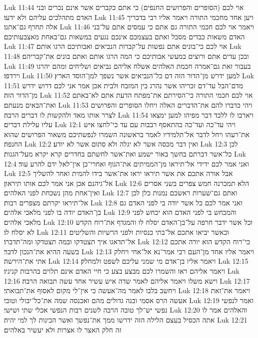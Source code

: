 Luk 11:44  אוי לכם (הסופרים והפרושים החנפים) כי אתם כקברים אשר אינם נכרים ובני האדם מתהלכים עליהם ולא ידעו׃
Luk 11:45  ויען אחד מחכמי התורה ויאמר אליו רבי בדבריך אלה תחרף גם־אתנו׃
Luk 11:46  ויאמר אוי לכם חכמי התורה גם אתם כי עמסים אתם על־בני האדם משאות כבדים מסבל ואתם בעצמכם אינכם נגעים במשאות גם־באחת מאצבעותיכם׃
Luk 11:47  אוי לכם כי־בונים אתם נפשות על־קברות הנביאים ואבותיכם הרגו אותם׃
Luk 11:48  ובכן עדים אתם ורוצים במעשי אבותיכם כי המה הרגו אותם ואתם בונים את־קבריהם׃
Luk 11:49  בעבור זאת גם־אמרה חכמת האלהים אשלח אליהם נביאים ושליחים ומהם יהרגו וירדפו׃
Luk 11:50  למען ידרש מן־הדור הזה דם כל־הנביאים אשר נשפך למן־הוסד הארץ׃
Luk 11:51  מדם־הבל עד־דם זכריהו אשר נהרג בין המזבח ולבית אכן אמר אני לכם דרוש ידרש מן־הדור הזה׃
Luk 11:52  אוי לכם חכמי התורה כי־הסירתם את־מפתח הדעת אתם לא־באתם ואת־הבאים מנעתם׃
Luk 11:53  ויהי כדברו להם את־הדברים האלה ויחלו הסופרים והפרושים לצרר אותו מאד ולהקשות לו דברים הרבה׃
Luk 11:54  ויארבו לו ללכד דבר מפיהו למען ימצאו עליו עלילת דברים׃
Luk 12:1  ויהי עד־כה ועד־כה בהתאסף רבבות עם עד כי־לחצו איש את־רעהו ויחל לדבר אל־תלמידיו לאמר בראשונה השמרו לנפשתיכם משאור הפרושים שהוא החנפה׃
Luk 12:2  ואין דבר מכסה אשר לא יגלה ולא סתום אשר לא יודע׃
Luk 12:3  לכן כל־אשר דברתם בחשך באור ישמע ואת־אשר לחשתם בחדרים קרא יקרא מעל־הגגות׃
Luk 12:4  ואני אמר לכם ידידי אל־תיראו מן־הממיתים את־הגוף ואחרי־כן אין־לאל ידם להרע עוד׃
Luk 12:5  אבל אורה אתכם את אשר תיראו יראו את־אשר בידו להמית ואחר להשליך אל־גיהנם אכן אני אמר לכם אותו תיראון׃
Luk 12:6  הלא תמכרנה חמש צפרים בשני אסרים ואין־אחת מהן נשכחת לפני האלהים׃
Luk 12:7  ואתם גם־שערות ראשכם נמנות כלן לכן אל־תיראו יקרתם מצפרים רבות׃
Luk 12:8  ואני אמר לכם כל אשר יודה בי לפני האדם גם בן־האדם יודה בו לפני מלאכי אלהים׃
Luk 12:9  והמכחש בי לפני האדם הוא יכחש לפני מלאכי אלהים׃
Luk 12:10  וכל אשר ידבר חרפה על־בן־האדם יסלח לו והמגדף את־רוח הקדש לא יסלח לו׃
Luk 12:11  וכאשר יביאו אתכם אל־בתי כנסיות ולפני הרשיות והשליטים אל־תדאגו איך תצטדקו ובמה תצטדקו ומה־תדברו׃
Luk 12:12  כי־רוח הקדש הוא יורה אתכם בשעה ההיא את־הנכון לדבר׃
Luk 12:13  ויאמר אליו אחד מן־העם רבי אמר־נא אל־אחי ויחלק אתי את־הירשה׃
Luk 12:14  ויאמר אליו בן־אדם מי שמני עליכם לשפט ולמחלק׃
Luk 12:15  ויאמר אליהם ראו והשמרו לכם מבצע בצע כי חיי האדם אינם תלוים בהרבות קניניו׃
Luk 12:16  וישא משלו ויאמר אליהם לאמר שדה איש עשיר אחד עשה תבואה הרבה׃
Luk 12:17  ויחשב בלבו לאמר מה־אעשה כי אין־לי מקום לאסוף את־תבואתי׃
Luk 12:18  ויאמר את־זאת אעשה הרס אסמי ובנה גדולים מהם ואכנסה שמה את־כל־יבולי וטובי׃
Luk 12:19  ואמר לנפשי נפשי יש־לך טובה הרבה לשנים רבות הנפשי אכלי שתי ושישי׃
Luk 12:20  והאלהים אמר לו אתה הכסיל בעצם הלילה הזה ידרשו ממך את־נפשך ואשר הכינות לך למי יהיה׃
Luk 12:21  זה חלק האצר לו אצרות ולא יעשיר באלהים׃
